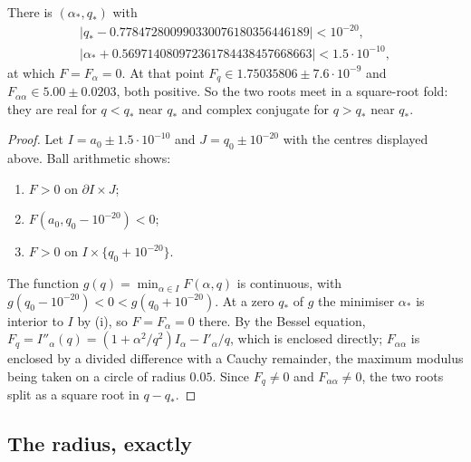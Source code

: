 \begin{theorem}\label{thm:collision}
There is $(\alpha_*,q_*)$ with
\begin{gather*}
|q_*-0.778472800990330076180356446189|<10^{-20},\\ |\alpha_*+0.569714080972361784438457668663|<1.5\cdot10^{-10},
\end{gather*}
at which $F=F_\alpha=0$. At that point $F_q\in1.75035806\pm7.6\cdot10^{-9}$ and $F_{\alpha\alpha}\in5.00\pm0.0203$, both positive. So the two roots meet in a square-root fold: they are real for $q<q_*$ near $q_*$ and complex conjugate for $q>q_*$ near $q_*$.
\end{theorem}
\begin{proof}
Let $I=a_0\pm1.5\cdot10^{-10}$ and $J=q_0\pm10^{-20}$ with the centres displayed above. Ball arithmetic shows:
\begin{enumerate}[label=(\roman*)]
\item $F>0$ on $\partial I\times J$;
\item $F(a_0,q_0-10^{-20})<0$;
\item $F>0$ on $I\times\{q_0+10^{-20}\}$.
\end{enumerate}
The function $g(q)=\min_{\alpha\in I}F(\alpha,q)$ is continuous, with $g(q_0-10^{-20})<0<g(q_0+10^{-20})$. At a zero $q_*$ of $g$ the minimiser $\alpha_*$ is interior to $I$ by (i), so $F=F_\alpha=0$ there. By the Bessel equation, $F_q=I''_\alpha(q)=(1+\alpha^2/q^2)I_\alpha-I'_\alpha/q$, which is enclosed directly; $F_{\alpha\alpha}$ is enclosed by a divided difference with a Cauchy remainder, the maximum modulus being taken on a circle of radius $0.05$. Since $F_q\ne0$ and $F_{\alpha\alpha}\ne0$, the two roots split as a square root in $q-q_*$.
\end{proof}

\subsection{The radius, exactly}


